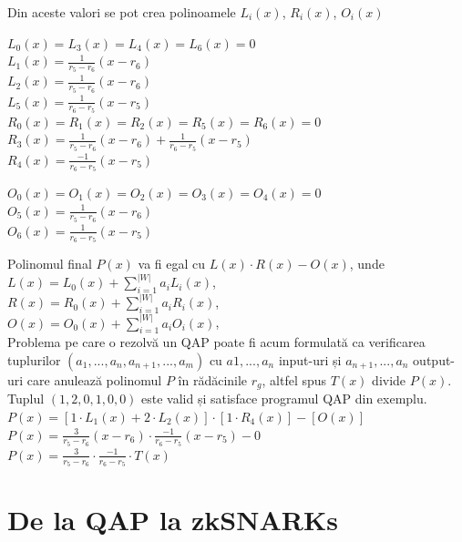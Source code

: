 Din aceste valori se pot crea polinoamele $L_i(x)$, $R_i(x)$, $O_i(x)$
\begin{multicols}{2}
$L_0(x) = L_3(x) = L_4(x) = L_6(x) = 0$ \\
$L_1(x) = \frac{1}{r_5 - r_6} (x - r_6)$ \\
$L_2(x) = \frac{1}{r_5 - r_6} (x - r_6)$ \\
$L_5(x) = \frac{1}{r_6 - r_5} (x - r_5)$ \\

\vfill
\columnbreak
$R_0(x) = R_1(x) = R_2(x) = R_5(x) = R_6(x) = 0$ \\
$R_3(x) = \frac{1}{r_5 - r_6} (x - r_6) + \frac{1}{r_6 - r_5} (x - r_5)$ \\
$R_4(x) = \frac{-1}{r_6 - r_5} (x - r_5)$ 
\end{multicols}

\begin{center}
$O_0(x) = O_1(x) = O_2(x) = O_3(x) = O_4(x) = 0$ \\
$O_5(x) = \frac{1}{r_5 - r_6} (x - r_6)$ \\
$O_6(x) = \frac{1}{r_6 - r_5} (x - r_5)$ \\
\end{center}

Polinomul final $P(x)$ va fi egal cu $L(x) \cdot R(x) - O(x)$, unde \\
$L(x) = L_0(x) + \sum_{i = 1}^{|W|} a_iL_i(x)$,\\
$R(x) = R_0(x) + \sum_{i = 1}^{|W|} a_iR_i(x)$,\\
$O(x) = O_0(x) + \sum_{i = 1}^{|W|} a_iO_i(x)$,\\

Problema pe care o rezolvă un QAP poate fi acum formulată ca verificarea tuplurilor $(a_1,...,a_n,a_{n+1},...,a_m)$ cu $a1,...,a_n$ input-uri și $a_{n+1},...,a_n$ output-uri care anulează polinomul $P$ în rădăcinile $r_g$, altfel spus $T(x)$ divide $P(x)$.\\

Tuplul $(1,2,0,1,0,0)$ este valid și satisface programul QAP din exemplu.\\
$P(x) = [1 \cdot L_1(x) + 2 \cdot L_2(x)] \cdot [1 \cdot R_4(x)] - [O(x)]$\\
$P(x) = \frac{3}{r_5 - r_6} (x - r_6) \cdot \frac{-1}{r_6 - r_5} (x - r_5) - 0$\\
$P(x) = \frac{3}{r_5 - r_6} \cdot \frac{-1}{r_6 - r_5} \cdot T(x)$

\clearpage

\section{De la QAP la zkSNARKs}

